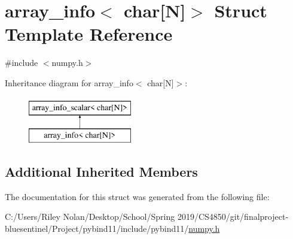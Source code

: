 \hypertarget{structarray__info_3_01char[_n]_4}{}\section{array\+\_\+info$<$ char\mbox{[}N\mbox{]}$>$ Struct Template Reference}
\label{structarray__info_3_01char[_n]_4}


{\ttfamily \#include $<$numpy.\+h$>$}

Inheritance diagram for array\+\_\+info$<$ char\mbox{[}N\mbox{]}$>$\+:\begin{figure}[H]
\begin{center}
\leavevmode
\includegraphics[height=2.000000cm]{structarray__info_3_01char[_n]_4}
\end{center}
\end{figure}
\subsection*{Additional Inherited Members}


The documentation for this struct was generated from the following file\+:\begin{DoxyCompactItemize}
\item 
C\+:/\+Users/\+Riley Nolan/\+Desktop/\+School/\+Spring 2019/\+C\+S4850/git/finalproject-\/bluesentinel/\+Project/pybind11/include/pybind11/\mbox{\hyperlink{numpy_8h}{numpy.\+h}}\end{DoxyCompactItemize}

